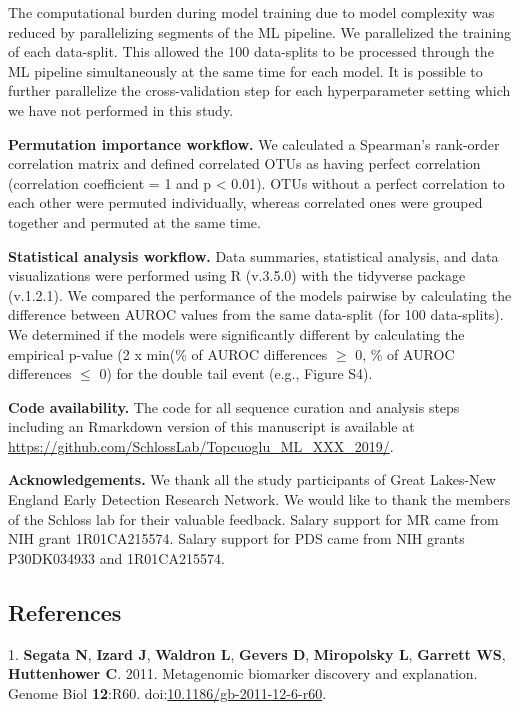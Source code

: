\documentclass[
  11pt,
]{article}
\begin{document}
The computational burden during model training due to model complexity
was reduced by parallelizing segments of the ML pipeline. We
parallelized the training of each data-split. This allowed the 100
data-splits to be processed through the ML pipeline simultaneously at
the same time for each model. It is possible to further parallelize the
cross-validation step for each hyperparameter setting which we have not
performed in this study.

\textbf{Permutation importance workflow.} We calculated a Spearman's
rank-order correlation matrix and defined correlated OTUs as having
perfect correlation (correlation coefficient = 1 and p \textless{}
0.01). OTUs without a perfect correlation to each other were permuted
individually, whereas correlated ones were grouped together and permuted
at the same time.

\textbf{Statistical analysis workflow.} Data summaries, statistical
analysis, and data visualizations were performed using R (v.3.5.0) with
the tidyverse package (v.1.2.1). We compared the performance of the
models pairwise by calculating the difference between AUROC values from
the same data-split (for 100 data-splits). We determined if the models
were significantly different by calculating the empirical p-value (2 x
min(\% of AUROC differences \(\geq\) 0, \% of AUROC differences \(\leq\)
0) for the double tail event (e.g., Figure S4).

\textbf{Code availability.} The code for all sequence curation and
analysis steps including an Rmarkdown version of this manuscript is
available at \url{https://github.com/SchlossLab/Topcuoglu_ML_XXX_2019/}.

\textbf{Acknowledgements.} We thank all the study participants of Great
Lakes-New England Early Detection Research Network. We would like to
thank the members of the Schloss lab for their valuable feedback. Salary
support for MR came from NIH grant 1R01CA215574. Salary support for PDS
came from NIH grants P30DK034933 and 1R01CA215574.

\newpage

\hypertarget{references}{%
\subsection{References}\label{references}}

\hypertarget{refs}{}
\leavevmode\hypertarget{ref-segata_metagenomic_2011}{}%
1. \textbf{Segata N}, \textbf{Izard J}, \textbf{Waldron L},
\textbf{Gevers D}, \textbf{Miropolsky L}, \textbf{Garrett WS},
\textbf{Huttenhower C}. 2011. Metagenomic biomarker discovery and
explanation. Genome Biol \textbf{12}:R60.
doi:\href{https://doi.org/10.1186/gb-2011-12-6-r60}{10.1186/gb-2011-12-6-r60}.
\end{document}
